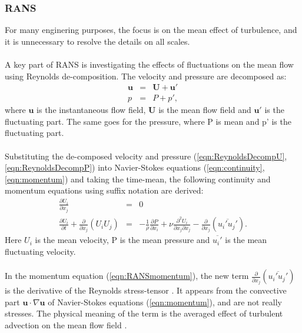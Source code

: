 \documentclass[a4paper, 12pt]{report}
\begin{document}
\subsubsection{RANS}
For many enginering purposes, the focus is on the mean effect of turbulence, and it is unnecessary to resolve the details on all scales.\\
\\
A key part of RANS is investigating the effects of fluctuations on the mean flow using Reynolds de-composition. The velocity and pressure are decomposed as:
\begin{eqnarray}
\label{eqn:ReynoldsDecompU}
\mathbf{u} &=& \mathbf{U} + \mathbf{u'} \\
\label{eqn:ReynoldsDecompP}
p &=& P + p',
\end{eqnarray}
where $\mathbf{u}$ is the instantaneous flow field, $\mathbf{U}$ is the mean flow field and $\mathbf{u'}$ is the fluctuating part. The same goes for the pressure, where P is mean and p' is the fluctuating part.\\
\\
Substituting the de-composed velocity and pressure (\ref{eqn:ReynoldsDecompU}, \ref{eqn:ReynoldsDecompP}) into Navier-Stokes equations (\ref{eqn:continuity}, \ref{eqn:momentum}) and taking the time-mean, the following continuity and momentum equations using suffix notation are derived:
\begin{eqnarray}
\label{eqn:RANScontinuity}
\frac{\partial U_i}{\partial x_j}  &=& 0 \\
\label{eqn:RANSmomentum}
\frac{\partial U_i}{\partial t} +  \frac{\partial}{\partial x_j}(U_i U_j) &=& -\frac{1}{\rho} \frac{\partial P}{\partial x_i} + \nu \frac{\partial ^2 U_i}{\partial x_j \partial x_j} - \frac{\partial}{\partial x_j} (\overline {u_i' u_j'}).
\end{eqnarray}
Here $U_i$ is the mean velocity, P is the mean pressure and $\overline{u_i'}$ is the mean fluctuating velocity.\\
\\
In the momentum equation (\ref{eqn:RANSmomentum}), the new term $\frac{\partial }{\partial x_j}(\overline{u_i'u_j'})$ is the derivative of the Reynolds stress-tensor \citep{UNIK4900}. It appears from the convective part $ \mathbf{u} \cdot \nabla \mathbf{u}$ of Navier-Stokes equations (\ref{eqn:momentum}), and are not really stresses. The physical meaning of the term is the averaged effect of turbulent advection on the mean flow field \cite{UNIK4900}.\\
\\
\end{document}
